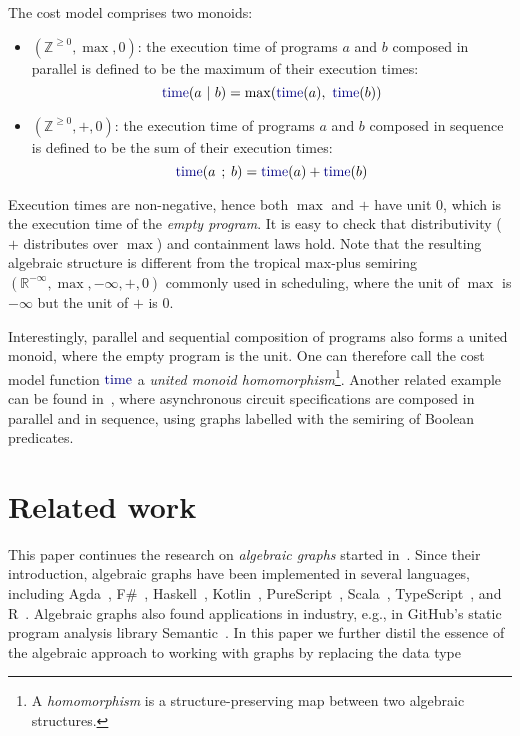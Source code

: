 \documentclass[english,submission]{programming}
\newcommand{\code}[1]{\lstinline[mathescape]|#1|}
\newcommand{\hcode}[1]{{\color{darkblue} \lstinline[keywordstyle={}]|#1|}} %
\begin{document}
\newpage
\noindent
The cost model comprises two monoids:

\begin{itemize}
    \item $(\mathbb{Z}^{\ge 0}, \max, 0)$: the execution time of programs $a$
    and $b$ composed in parallel is defined to be the maximum of their execution
    times:
    \[
    \text{\hcode{time}}(a\ \text{\code{|}}\ b) = \max(\text{\hcode{time}}(a),\ \text{\hcode{time}}(b))
    \]

    \item $(\mathbb{Z}^{\ge 0}, +, 0)$: the execution time of programs $a$ and
    $b$ composed in sequence is defined to be the sum of their execution times:
    \[
    \text{\hcode{time}}(a\ \text{\code{;}}\ b) = \text{\hcode{time}}(a) + \text{\hcode{time}}(b)
    \]
\end{itemize}

\noindent
Execution times are non-negative, hence both $\max$ and $+$ have unit $0$,
which is the execution time of the \emph{empty program}. It is easy to check
that distributivity ($+$ distributes over $\max$) and containment laws hold.
Note that the resulting algebraic structure is different from the tropical
max-plus semiring $(\mathbb{R}^{-\infty}, \max, -\infty, +, 0)$ commonly used in
scheduling, where the unit of $\max$ is $-\infty$ but the unit of $+$ is $0$.

Interestingly, parallel and sequential composition of programs also forms a
united monoid, where the empty program is the unit. One can therefore call the
cost model function $\text{\hcode{time}}$ a \emph{united monoid
homomorphism}\footnote{
    A \emph{homomorphism} is a structure-preserving map between two algebraic
    structures.
}. Another related example can be found in~\cite{beaumont2017concepts}, where
asynchronous circuit specifications are composed in parallel and in sequence,
using graphs labelled with the semiring of Boolean predicates.


\section{Related work}\label{sec-related-work}

This paper continues the research on \emph{algebraic graphs} started
in~\cite{mokhov_alga}. Since their introduction, algebraic graphs have been
implemented in several languages, including Agda~\cite{alga_agda},
F\#~\cite{alga_fsharp}, Haskell~\cite{alga_haskell},
Kotlin~\cite{alga_kotlin}, PureScript~\cite{alga_purescript},
Scala~\cite{alga_scala}, TypeScript~\cite{alga_typescript}, and
R~\cite{alga_r}. Algebraic graphs also found applications in industry, e.g., in
GitHub's static program analysis library
Semantic~\cite{semantic_paper}\cite{semantic_repo}. In this paper we further
distil the essence of the algebraic approach to working with graphs by replacing
the data type
\end{document}

